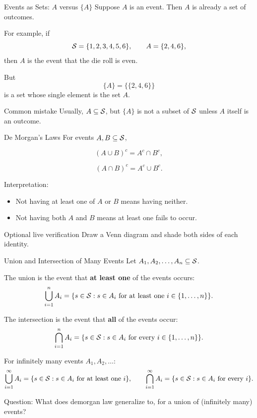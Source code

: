 \begin{frame}{Events as Sets: $A$ versus $\{A\}$}
Suppose $A$ is an event. Then $A$ is already a set of outcomes.

For example, if
\[
\mathcal{S} = \{1,2,3,4,5,6\},
\qquad
A = \{2,4,6\},
\]
then $A$ is the event that the die roll is even.

\vspace{0.25cm}

But
\[
\{A\} = \big\{\{2,4,6\}\big\}
\]
is a set whose single element is the set $A$.

\vspace{0.25cm}

\begin{keybox}{Common mistake}
Usually, $A \subseteq \mathcal{S}$, but $\{A\}$ is not a subset of $\mathcal{S}$ unless $A$ itself is an outcome.
\end{keybox}
\end{frame}

\begin{frame}{De Morgan's Laws}
For events $A,B \subseteq \mathcal{S}$,

\[
(A \cup B)^c = A^c \cap B^c,
\]

\[
(A \cap B)^c = A^c \cup B^c.
\]

\vspace{0.3cm}

Interpretation:

\begin{itemize}
    \item Not having at least one of $A$ or $B$ means having neither.
    \item Not having both $A$ and $B$ means at least one fails to occur.
\end{itemize}

\vspace{0.25cm}

\begin{livebox}{Optional live verification}
Draw a Venn diagram and shade both sides of each identity.
\end{livebox}
\end{frame}

\begin{frame}{Union and Intersection of Many Events}
Let $A_1,A_2,\dots,A_n \subseteq \mathcal{S}$.

The union is the event that \textbf{at least one} of the events occurs:
\[
\bigcup_{i=1}^n A_i
=
\{s \in \mathcal{S} : s \in A_i \text{ for at least one } i \in \{1,\dots,n\}\}.
\]

The intersection is the event that \textbf{all} of the events occur:
\[
\bigcap_{i=1}^n A_i
=
\{s \in \mathcal{S} : s \in A_i \text{ for every } i \in \{1,\dots,n\}\}.
\]

\vspace{0.25cm}

For infinitely many events $A_1,A_2,\dots$:
\[
\bigcup_{i=1}^{\infty} A_i
=
\{s \in \mathcal{S} : s \in A_i \text{ for at least one } i\}, \quad \quad \bigcap_{i=1}^{\infty} A_i
=
\{s \in \mathcal{S} : s \in A_i \text{ for every } i\}.
\]

Question: What does demorgan law generalize to, for a union of (infinitely many) events?
\end{frame}


